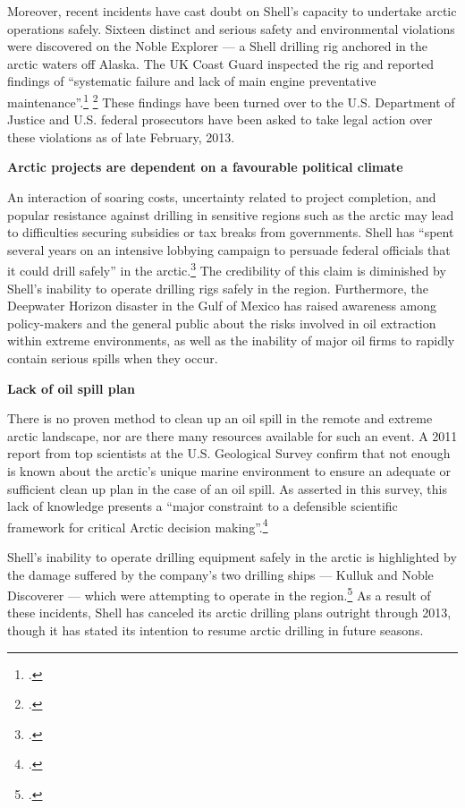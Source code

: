 \documentclass[10pt]{article}
\begin{document}
Moreover, recent incidents have cast doubt on Shell's capacity to undertake arctic operations safely. 
Sixteen distinct and serious safety and environmental violations were discovered on the Noble Explorer --- a Shell drilling rig anchored in the arctic waters off Alaska. 
The UK Coast Guard inspected the rig and reported findings of ``systematic failure and lack of main engine preventative maintenance''.\footcite{RigFindings} \footcite[See also: ][]{ArcticUnsafe}
These findings have been turned over to the U.S. Department of Justice and U.S. federal prosecutors have been asked to take legal action over these violations as of late February, 2013. 



\textbf{Arctic projects are dependent on a favourable political climate}



An interaction of soaring costs, uncertainty related to project completion, and popular resistance against drilling in sensitive regions such as the arctic may lead to difficulties securing subsidies or tax breaks from governments.
Shell has ``spent several years on an intensive lobbying campaign to persuade federal officials that it could drill safely'' in the arctic.\footcite{ShellSuspends}
The credibility of this claim is diminished by Shell's inability to operate drilling rigs safely in the region.
Furthermore, the Deepwater Horizon disaster in the Gulf of Mexico has raised awareness among policy-makers and the general public about the risks involved in oil extraction within extreme environments, as well as the inability of major oil firms to rapidly contain serious spills when they occur.



\textbf{Lack of oil spill plan}



There is no proven method to clean up an oil spill in the remote and extreme arctic landscape, nor are there many resources available for such an event. 
A 2011 report from top scientists at the U.S. Geological Survey confirm that not enough is known about the arctic's unique marine environment to ensure an adequate or sufficient clean up plan in the case of an oil spill. 
As asserted in this survey, this lack of knowledge presents a ``major constraint to a defensible scientific framework for critical Arctic decision making''.\footcite[][]{Holland-BartelsPierce_2011}



Shell's inability to operate drilling equipment safely in the arctic is highlighted by the damage suffered by the company's two drilling ships --- Kulluk and Noble Discoverer --- which were attempting to operate in the region.\footcite{ShellSuspends}
As a result of these incidents, Shell has canceled its arctic drilling plans outright through 2013, though it has stated its intention to resume arctic drilling in future seasons.
\end{document}
